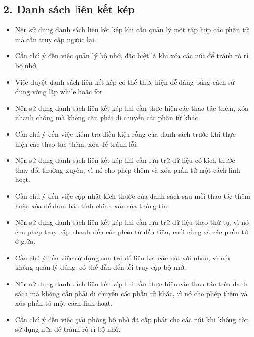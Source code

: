 \subsection*{2. Danh sách liên kết kép}
\begin{itemize}
    \item Nên sử dụng danh sách liên kết kép khi cần quản lý một tập hợp các phần tử mà cần truy cập ngược lại.
    \item Cần chú ý đến việc quản lý bộ nhớ, đặc biệt là khi xóa các nút để tránh rò rỉ bộ nhớ.
    \item Việc duyệt danh sách liên kết kép có thể thực hiện dễ dàng bằng cách sử dụng vòng lặp while hoặc for.
    \item Nên sử dụng danh sách liên kết kép khi cần thực hiện các thao tác thêm, xóa nhanh chóng mà không cần phải di chuyển các phần tử khác.
    \item Cần chú ý đến việc kiểm tra điều kiện rỗng của danh sách trước khi thực hiện các thao tác thêm, xóa để tránh lỗi.
    \item Nên sử dụng danh sách liên kết kép khi cần lưu trữ dữ liệu có kích thước thay đổi thường xuyên, vì nó cho phép thêm và xóa phần tử một cách linh hoạt.
    \item Cần chú ý đến việc cập nhật kích thước của danh sách sau mỗi thao tác thêm hoặc xóa để đảm bảo tính chính xác của thông tin.
    \item Nên sử dụng danh sách liên kết kép khi cần lưu trữ dữ liệu theo thứ tự, vì nó cho phép truy cập nhanh đến các phần tử đầu tiên, cuối cùng và các phần tử ở giữa.
    \item Cần chú ý đến việc sử dụng con trỏ để liên kết các nút với nhau, vì nếu không quản lý đúng, có thể dẫn đến lỗi truy cập bộ nhớ.
    \item Nên sử dụng danh sách liên kết kép khi cần thực hiện các thao tác trên danh sách mà không cần phải di chuyển các phần tử khác, vì nó cho phép thêm và xóa phần tử một cách linh hoạt.
    \item Cần chú ý đến việc giải phóng bộ nhớ đã cấp phát cho các nút khi không còn sử dụng nữa để tránh rò rỉ bộ nhớ.
\end{itemize}